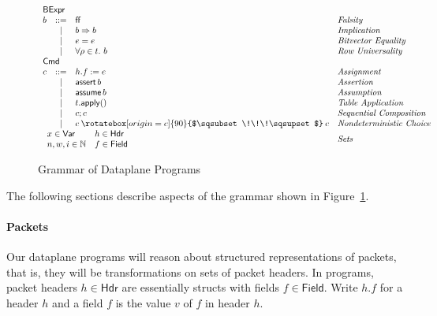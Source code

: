 \documentclass{article}
\newcommand{\FALSE}{\mathsf{ff}}
\newcommand{\BExpr}{\mathsf{BExpr}}
\newcommand{\Cmd}{\mathsf{Cmd}}
\newcommand{\Hdr}{\mathsf{Hdr}}
\newcommand{\Field}{\mathsf{Field}}
\newcommand{\Var}{\mathsf{Var}}
\newcommand{\assert}{\mathop{\mathsf{assert}}}
\newcommand{\assume}{\mathop{\mathsf{assume}}}
\newcommand{\apply}{\mathsf{apply}}
\newcommand{\choice}{\mathbin{\rotatebox[origin=c]{90}{$\sqsubset\!\!\!\sqsupset$}}}
\begin{document}
\begin{figure}[htp]
\[\begin{array}{lcll}
    \multicolumn{3}{l}{\BExpr} \\
    b & ::= & \FALSE  & \textit{Falsity}\\
      & \mid & b \Rightarrow b & \textit{Implication} \\
      & \mid & e = e & \textit{Bitvector Equality}\\
    & \mid & \forall \rho \in t.~b & \textit{Row Universality}\\
    \multicolumn{3}{l}{\Cmd} \\
    c & ::=  & h.f := e & \textit{Assignment}\\
      & \mid & \assert b & \textit{Assertion}\\
      & \mid & \assume b & \textit{Assumption}\\
      & \mid & t.\apply() & \textit{Table Application}\\
      & \mid & c;c & \textit{Sequential Composition} \\
    & \mid & c \choice c & \textit{Nondeterministic Choice}\\
    \multicolumn{3}{l}{
      \begin{array}{ll}
        x \in \Var & h \in \Hdr\\
        n,w,i \in \mathbb{N} & f \in \Field
    \end{array}} & \textit{Sets }\\
  \end{array}
\]
\caption{Grammar of Dataplane Programs}
\label{fig:grammar}
\end{figure}

The following sections describe aspects of the grammar shown in Figure~\ref{fig:grammar}.

\paragraph{Packets}
Our dataplane programs will reason about structured representations of packets,
that is, they will be transformations on sets of packet headers. In programs,
packet headers $h \in \Hdr$ are essentially structs with fields $f \in
\Field$. Write $h.f$ for a header $h$ and a field $f$ is the value $v$ of $f$
in header $h$.
\end{document}
